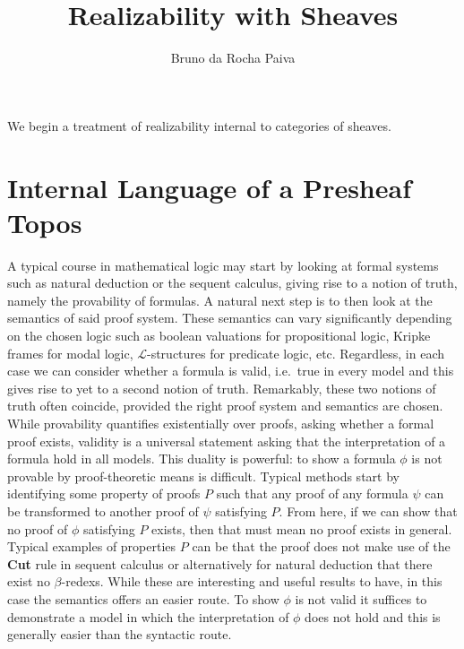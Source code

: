 \documentclass[12pt]{article}
\begin{document}
\title{Realizability with Sheaves}
\author{Bruno da Rocha Paiva}
\maketitle

We begin a treatment of realizability internal to categories of sheaves.

\newpage
\section{Internal Language of a Presheaf Topos}

A typical course in mathematical logic may start by looking at formal systems
such as natural deduction or the sequent calculus, giving rise to a notion of
truth, namely the provability of formulas. A natural next step is to then look
at the semantics of said proof system. These semantics can vary significantly
depending on the chosen logic such as boolean valuations for propositional
logic, Kripke frames for modal logic, \(\mathcal{L}\)-structures for predicate
logic, etc. Regardless, in each case we can consider whether a formula is valid,
i.e.\ true in every model and this gives rise to yet to a second notion of
truth. Remarkably, these two notions of truth often coincide, provided the right
proof system and semantics are chosen. While provability quantifies
existentially over proofs, asking whether a formal proof exists, validity is a
universal statement asking that the interpretation of a formula hold in all
models. This duality is powerful: to show a formula \(\phi\) is not provable by
proof-theoretic means is difficult. Typical methods start by identifying some
property of proofs \(P\) such that any proof of any formula \(\psi\) can be
transformed to another proof of \(\psi\) satisfying \(P\). From here, if we can
show that no proof of \(\phi\) satisfying \(P\) exists, then that must mean no
proof exists in general. Typical examples of properties \(P\) can be that the
proof does not make use of the \textbf{Cut} rule in sequent calculus or
alternatively for natural deduction that there exist no \(\beta\)-redexs. While
these are interesting and useful results to have, in this case the semantics
offers an easier route. To show \(\phi\) is not valid it suffices to demonstrate
a model in which the interpretation of \(\phi\) does not hold and this is
generally easier than the syntactic route.
\end{document}
